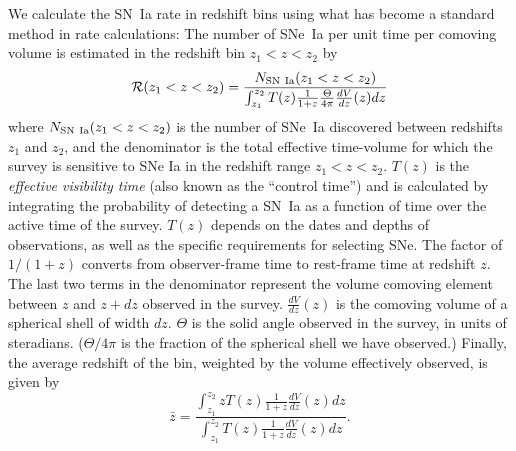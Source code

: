 
We calculate the SN~Ia rate in redshift bins using what has
become a standard method in rate calculations: The number of SNe~Ia
per unit time per comoving volume is estimated in the redshift bin
$z_1 < z < z_2$ by
\begin{equation} \label{eq:fieldrate}
\mathcal{R} (z_1 < z < z_2) = \frac{N_{\rm SN~Ia} (z_1 < z < z_2)}
        {\int_{z_1}^{z_2} T(z) \frac{1}{1+z}
          \frac{\Theta}{4\pi}\frac{dV}{dz}(z) dz}
\end{equation}
where $N_{\rm SN~Ia} (z_1 < z < z_2)$ is the number of SNe~Ia
discovered between redshifts $z_1$ and $z_2$, and the denominator is
the total effective time-volume for which the survey is sensitive to
SNe Ia in the redshift range $z_1<z<z_2$. $T(z)$ is the
\emph{effective visibility time} (also known as the ``control time'')
and is calculated by integrating the probability of detecting a SN~Ia
as a function of time over the active time of the survey. $T(z)$
depends on the dates and depths of observations, as well as the
specific requirements for selecting SNe. The factor of $1/(1+z)$
converts from observer-frame time to rest-frame time at redshift
$z$. The last two terms in the denominator represent the volume
comoving element between $z$ and $z + dz$ observed in the survey.
$\frac{dV}{dz}(z)$ is the comoving volume of a spherical shell of
width $dz$.  $\Theta$ is the solid angle observed in the survey, in
units of steradians. ($\Theta / 4\pi$ is the fraction of the spherical
shell we have observed.)  Finally, the average redshift of the bin,
weighted by the volume effectively observed, is given by
\begin{equation}
\bar{z} = \frac{\int_{z_1}^{z_2} z T(z) \frac{1}{1+z} \frac{dV}{dz}(z) dz}
        {\int_{z_1}^{z_2} T(z) \frac{1}{1+z} \frac{dV}{dz}(z) dz}.
\end{equation}
